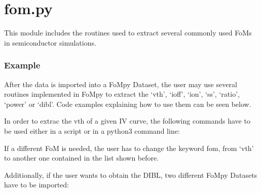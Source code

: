 \documentclass[letterpaper,10pt,english,openany, oneside]{sphinxmanual}
\begin{document}
\label{\detokenize{index:module-fompy.fom}}

\section{fom.py}
\label{\detokenize{index:fom-py}}
This module includes the routines used to extract several commonly used FoMs
in semiconductor simulations.
\subsubsection*{Example}

After the data is imported into a FoMpy Dataset, the user may use several routines implemented in FoMpy to extract the ‘vth’, ‘ioff’, ‘ion’, ‘ss’, ‘ratio’, ‘power’ or ‘dibl’. Code examples explaining how to use them can be seen below.

In order to extrac the vth of a given IV curve, the following commands have to be used either in a script or
in a python3 command line:

%
\begin{sphinxVerbatim}[commandchars=\\\{\}]
 
  
   
     
\end{sphinxVerbatim}

If a different FoM is needed, the user has to change the keyword fom, from ‘vth’ to another one contained in the list shown before.

Additionally, if the user wants to obtain the DIBL, two different FoMpy Datasets have to be imported:
\end{document}
